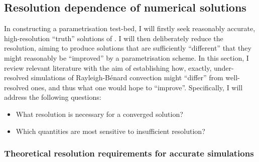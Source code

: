 \documentclass[titlepage,twoside]{article}
\numberwithin{equation}{section}
\newcommand{\rb}{Rayleigh-B\'{e}nard}
\begin{document}
\subsection{Resolution dependence of numerical solutions}
In constructing a parametrisation test-bed, I will firstly seek
reasonably accurate, high-resolution ``truth'' solutions of
. I will then deliberately reduce
the resolution, aiming to produce solutions that are sufficiently
``different'' that they might reasonably be ``improved'' by a parametrisation
scheme. In this section, I review relevant literature with the aim of
establishing how, exactly, under-resolved simulations of \rb{} convection
might ``differ'' from well-resolved ones, and thus what one would hope to
``improve''. Specifically, I will address the following questions:
\begin{itemize}
    \item What resolution is necessary for a converged solution?
    \item Which quantities are most sensitive to insufficient resolution?
\end{itemize}

\subsubsection{Theoretical resolution requirements for accurate simulations}%
\label{sec:res_requirements}
\end{document}
